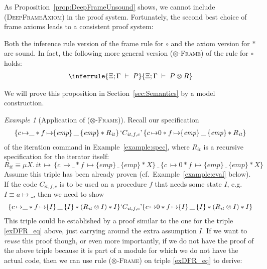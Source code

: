 \documentclass{LMCS}
\theoremstyle{remark}
\newtheorem{example}[theorem]{Example}
\newcommand{\QUOTE}[1]{\textnormal{`\ensuremath{#1}'}}
\newcommand{\triple}[3]{{\ensuremath{\!\left.\{ #1 \}\, #2\, \{  #3 \}\!\right.}}}
\newcommand{\pointsto}{\ensuremath{\mapsto}}
\newcommand{\EMP}{\ensuremath{\textit{emp}}}
\newcommand{\X}{\ensuremath{\Xi}}
\begin{document}
As Proposition~\ref{prop:DeepFrameUnsound} shows, we cannot include (\textsc{DeepFrameAxiom}) in the proof system. 
Fortunately, 
the second best choice of frame axioms leads to a consistent proof system:
\begin{prop}
Both the inference rule version of the frame rule for $\circ$ and the axiom version for $*$
are sound.
In fact, the  following more general version (\textsc{$\otimes$-Frame}) of the rule for $\circ$ holds:
\begin{align*}
\inferrule
{
  \X;\Gamma \;\adash\; P
}{
  \X;\Gamma \;\adash\; P\otimes R
}
\end{align*}
\end{prop}
We will prove this proposition in Section~\ref{sec:Semantics} by a model construction. 

\begin{example}[Application of (\textsc{$\otimes$-Frame})]
\label{example:DFR} 
Recall our specification
\begin{align}\label{exDFR_eq}
\triple{c\, {\pointsto}\_ * f\,{\pointsto}\triple{\EMP}{\_}{\EMP} * R_{\mathit{it}}}
{\QUOTE{C_{\mathit{it},f,c}}}
{c\,{\pointsto}0 * f\,{\pointsto}\triple{\EMP}{\_}{\EMP} * R_{\mathit{it}}}
\end{align}
of the iteration command in Example~\ref{example:spec}, 
where $R_{\mathit{it}}$ is a recursive specification for the iterator itself:
$$R_{\mathit{it}} \equiv \mu X.\, \mathit{it} \, {\pointsto}\,
 \triple{c\,{\pointsto}\_ * f\,{\pointsto}\triple{\EMP}{\_}{\EMP} * X}
 {\_}
{c\,{\pointsto}0 * f\,{\pointsto}\triple{\EMP}{\_}{\EMP} * X}
$$
Assume this triple has been already proven (cf.\ Example~\ref{example:eval} below).
If the code $C_{\mathit{it},f,c}$ is to be used  on a procedure $f$ that 
 needs some state $I$, e.g.\ $I \equiv a{\pointsto}\_$, then we need to show
\[\begin{array}{l}
\{c\, {\pointsto}\_ * f\,{\pointsto}\triple{ I}{\_}{I}   * (R_{\mathit{it}} \otimes I) *I \}
{\QUOTE{C_{\mathit{it},f,c}}}
\{c\,{\pointsto}0 * f\,{\pointsto}\triple{I}{\_}{ I} * (R_{\mathit{it}} \otimes I) *  I  \}  
\end{array}
\]
This triple could be established by a proof similar to the one for the triple \ref{exDFR_eq} above, just carrying around the extra assumption $I$. If we want to \emph{reuse} this proof though, or even more importantly, if we do not have the proof of the above triple because it is part of a module for which we do not have the actual code, then we can use rule (\textsc{$\otimes$-Frame}) on triple \eqref{exDFR_eq} to derive:

\end{example}
\end{document}

